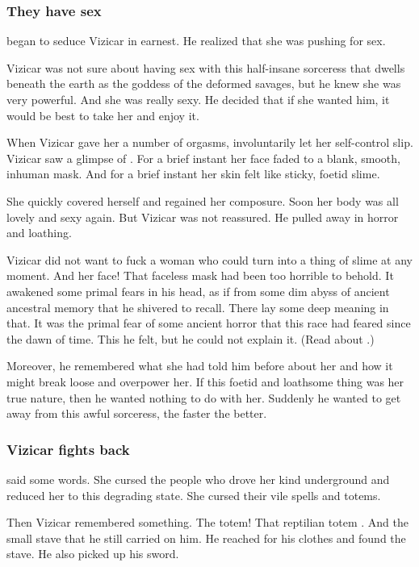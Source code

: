 \subsubsection{They have sex}
\Lethiarch began to seduce Vizicar in earnest.
He realized that she was pushing for sex. 

Vizicar was not sure about having sex with this half-insane sorceress that dwells beneath the earth as the goddess of the deformed savages, but he knew she was very powerful.
And she was really sexy.
He decided that if she wanted him, it would be best to take her and enjoy it.

When Vizicar gave her a number of orgasms, \Lethiarch involuntarily let her self-control slip.
Vizicar saw a glimpse of .
For a brief instant her face faded to a blank, smooth, inhuman mask.
And for a brief instant her skin felt like sticky, foetid slime. 

She quickly covered herself and regained her composure.
Soon her body was all lovely and sexy again.
But Vizicar was not reassured. 
He pulled away in horror and loathing.

Vizicar did not want to fuck a woman who could turn into a thing of slime at any moment.
And her face! 
That faceless mask had been too horrible to behold.
It awakened some primal fears in his head, as if from some dim abyss of ancient ancestral memory that he shivered to recall. 
There lay some deep meaning in that.
It was the primal fear of some ancient horror that this race had feared since the dawn of time.
This he felt, but he could not explain it.
(Read about .)

Moreover, he remembered what she had told him before about her  and how it might break loose and overpower her.
If this foetid and loathsome thing was her true nature, then he wanted nothing to do with her.
Suddenly he wanted to get away from this awful sorceress, the faster the better. 





\subsubsection{Vizicar fights back}
\Lethiarch said some words.
She cursed the \ophidian people who drove her kind underground and reduced her to this degrading state. 
She cursed their vile spells and totems.

Then Vizicar remembered something. 
The totem! 
That reptilian totem .
And the small stave that he still carried on him.
He reached for his clothes and found the stave.
He also picked up his sword.

